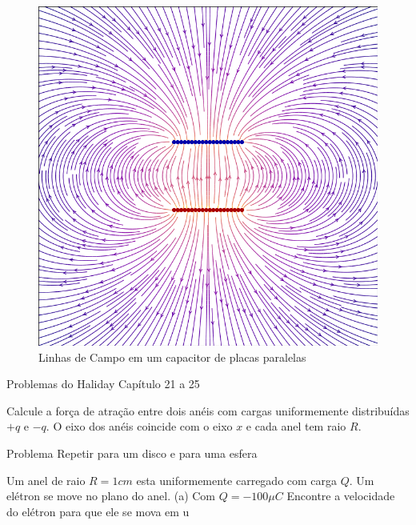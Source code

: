 \begin{figure}[h!]
\centering
\includegraphics[scale=0.6]{Images/capacitor.png}
\caption{Linhas de Campo em um capacitor de placas paralelas}\label{fig:capacitor-saida}
\end{figure}

Problemas do Haliday Capítulo 21 a 25

Calcule a força de atração entre dois anéis com cargas uniformemente distribuídas $+q$ e $-q$. O eixo dos anéis coincide com o eixo $x$ e cada anel tem raio $R$.

Problema Repetir para um disco e para uma esfera

Um anel de raio $R = 1 cm$ esta uniformemente carregado com carga $Q$. Um elétron se move no plano do anel. (a) Com  $Q= -100 \mu C$ Encontre a velocidade do elétron para que ele se mova  em u